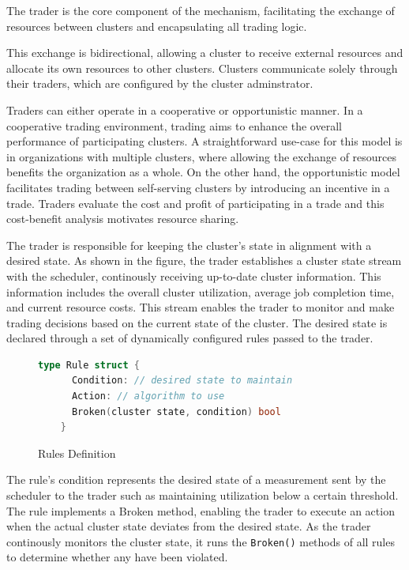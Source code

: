 The trader is the core component of the mechanism, facilitating the
exchange of resources between clusters and encapsulating all trading logic. 

This exchange is bidirectional, allowing a cluster to receive external
resources and allocate its own resources to other clusters. Clusters 
communicate solely through their traders, which are configured by the
cluster adminstrator. 

Traders can either operate in a cooperative or opportunistic manner. In a
cooperative trading environment, trading aims to enhance the overall
performance of participating clusters. A straightforward use-case for this
model is in organizations with multiple clusters, where allowing the exchange
of resources benefits the organization as a whole. On the other hand, the
opportunistic model facilitates trading between self-serving clusters by
introducing an incentive in a trade. Traders evaluate the cost and profit of
participating in a trade and this cost-benefit analysis motivates resource
sharing.

The trader is responsible for keeping the cluster's state in alignment with a
desired state. As shown in the figure, the trader establishes a cluster state
stream with the scheduler, continously receiving up-to-date cluster
information. This information includes the overall cluster utilization, average
job completion time, and current resource costs. This stream enables the trader
to monitor and make trading decisions based on the current state of the
cluster. The desired state is declared through a set of dynamically
configured rules passed to the trader.

\begin{figure}[H]
  \begin{lstlisting}[language=go]
    type Rule struct {
      Condition: // desired state to maintain
      Action: // algorithm to use
      Broken(cluster state, condition) bool
    } 
  \end{lstlisting}
  \caption{Rules Definition}
\end{figure}

The rule's condition represents the desired state of a measurement sent by the
scheduler to the trader such as maintaining utilization below a certain
threshold. The rule implements a Broken method, enabling the trader to execute 
an action when the actual cluster state deviates from the desired state. As the
trader continously monitors the cluster state, it runs the \lstinline{Broken()} methods of
all rules to determine whether any have been violated.

